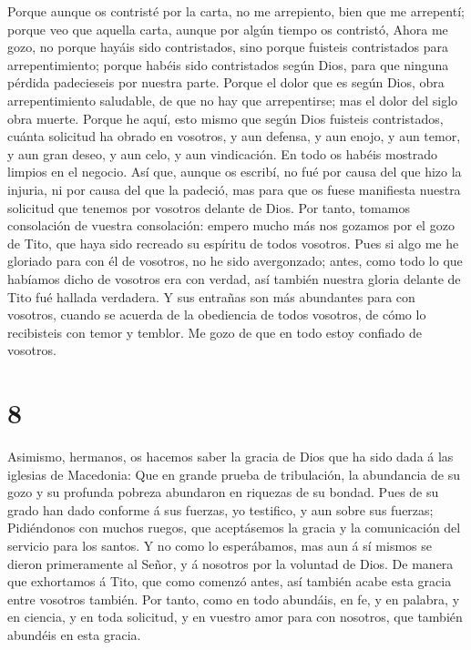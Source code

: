  Porque aunque os contristé por la carta, no me arrepiento,
bien que me arrepentí; porque veo que aquella carta, aunque por algún
tiempo os contristó,  Ahora me gozo, no porque hayáis sido
contristados, sino porque fuisteis contristados para arrepentimiento;
porque habéis sido contristados según Dios, para que ninguna pérdida
padecieseis por nuestra parte.  Porque el dolor que es
según Dios, obra arrepentimiento saludable, de que no hay que
arrepentirse; mas el dolor del siglo obra muerte.  Porque
he aquí, esto mismo que según Dios fuisteis contristados, cuánta
solicitud ha obrado en vosotros, y aun defensa, y aun enojo, y aun
temor, y aun gran deseo, y aun celo, y aun vindicación. En todo os
habéis mostrado limpios en el negocio.  Así que, aunque os
escribí, no fué por causa del que hizo la injuria, ni por causa del que
la padeció, mas para que os fuese manifiesta nuestra solicitud que
tenemos por vosotros delante de Dios.  Por tanto, tomamos
consolación de vuestra consolación: empero mucho más nos gozamos por el
gozo de Tito, que haya sido recreado su espíritu de todos vosotros.
 Pues si algo me he gloriado para con él de vosotros, no he
sido avergonzado; antes, como todo lo que habíamos dicho de vosotros era
con verdad, así también nuestra gloria delante de Tito fué hallada
verdadera.  Y sus entrañas son más abundantes para con
vosotros, cuando se acuerda de la obediencia de todos vosotros, de cómo
lo recibisteis con temor y temblor.  Me gozo de que en todo
estoy confiado de vosotros.

\hypertarget{section-7}{%
\section{8}\label{section-7}}

 Asimismo, hermanos, os hacemos saber la gracia de Dios que
ha sido dada á las iglesias de Macedonia:  Que en grande
prueba de tribulación, la abundancia de su gozo y su profunda pobreza
abundaron en riquezas de su bondad.  Pues de su grado han
dado conforme á sus fuerzas, yo testifico, y aun sobre sus fuerzas;
 Pidiéndonos con muchos ruegos, que aceptásemos la gracia y
la comunicación del servicio para los santos.  Y no como lo
esperábamos, mas aun á sí mismos se dieron primeramente al Señor, y á
nosotros por la voluntad de Dios.  De manera que exhortamos
á Tito, que como comenzó antes, así también acabe esta gracia entre
vosotros también.  Por tanto, como en todo abundáis, en fe,
y en palabra, y en ciencia, y en toda solicitud, y en vuestro amor para
con nosotros, que también abundéis en esta gracia.

